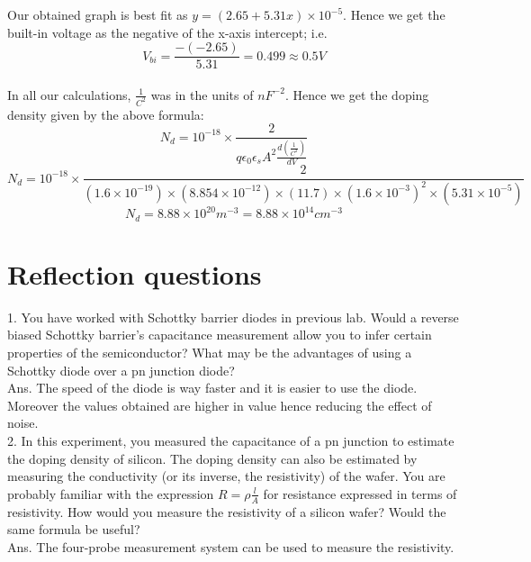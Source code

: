 \documentclass[12pt]{article}
\begin{document}
Our obtained graph is best fit as \( y = (2.65 + 5.31x) \times 10^{-5} \). Hence we get the built-in voltage as the negative of the x-axis intercept; i.e. \[ V_{bi} = \frac{-(-2.65)}{5.31} = 0.499 \approx 0.5V \] \\
In all our calculations, \( \frac{1}{C^2} \) was in the units of \( nF^{-2} \). Hence we get the doping density given by the above formula: \[ N_d = 10^{-18} \times \frac{2}{q\epsilon_0\epsilon_sA^2\frac{d(\frac{1}{C^2})}{dV}}\] \[ N_d = 10^{-18} \times \frac{2}{(1.6 \times 10^{-19}) \times (8.854 \times 10^{-12}) \times (11.7) \times (1.6 \times 10^{-3})^2 \times (5.31 \times 10^{-5})} \] \[ N_d = 8.88 \times 10^{20} m^{-3} = 8.88 \times 10^{14} cm^{-3} \]

\section{Reflection questions}

1. You have worked with Schottky barrier diodes in previous lab. Would a reverse biased Schottky barrier's capacitance measurement allow you to infer certain properties of the semiconductor? What may be the advantages of using a Schottky diode over a pn junction diode?\\
Ans. The speed of the diode is way faster and it is easier to use the diode. Moreover the values obtained are higher in value hence reducing the effect of noise.\\

2. In this experiment, you measured the capacitance of a pn junction to estimate the doping density of silicon. The doping density can also be estimated by measuring the conductivity (or its inverse, the resistivity) of the wafer. You are probably familiar with the expression $R=\rho\frac{l}{A}$ for resistance expressed in terms of resistivity. How would you measure the resistivity of a silicon wafer? Would the same formula be useful?\\
Ans. The four-probe measurement system can be used to measure the resistivity.\\
\end{document}

